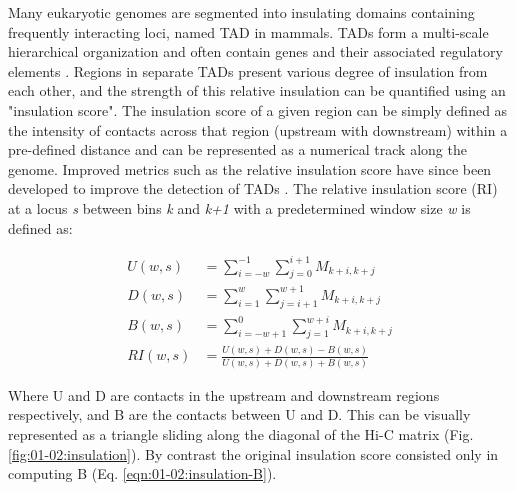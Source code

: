 Many eukaryotic genomes are segmented into insulating domains containing frequently interacting loci, named \acrshort{TAD} in mammals. \acrshort{TAD}s form a multi-scale hierarchical organization and often contain genes and their associated regulatory elements \cite{salviatoLeveragingThreedimensionalChromatin2021}. Regions in separate \acrshort{TAD}s present various degree of insulation from each other, and the strength of this relative insulation can be quantified using an "insulation score". The insulation score of a given region can be simply defined as the intensity of contacts across that region (upstream with downstream) within a pre-defined distance \cite{craneCondensindrivenRemodellingChromosome2015} and can be represented as a numerical track along the genome. Improved metrics such as the relative insulation score have since been developed to improve the detection of \acrshort{TAD}s \cite{chenHiCDBSensitiveRobust2018}. The relative insulation score (RI) at a locus \textit{s} between bins \textit{k} and \textit{k+1} with a predetermined window size \textit{w} is defined as:

\begin{align}
    \label{eqn:01-02:insulation-U}
    U(w, s) &= \sum_{i=-w}^{-1}{\sum_{j=0}^{i+1}{M_{k+i,k+j}}} \\
    \label{eqn:01-02:insulation-D}
    D(w, s) &= \sum_{i=1}^{w}{\sum_{j=i+1}^{w+1}{M_{k+i,k+j}}} \\
    \label{eqn:01-02:insulation-B}
    B(w, s) &= \sum_{i=-w+1}^{0}{\sum_{j=1}^{w+i}{M_{k+i,k+j}}} \\
    \label{eqn:01-02:insulation-RI}
    RI(w, s) &= \frac{U(w, s) + D(w, s) - B(w, s)}{U(w, s) + D(w, s) + B(w, s)}
\end{align}

Where U and D are contacts in the upstream and downstream regions respectively, and B are the contacts between U and D. This can be visually represented as a triangle sliding along the diagonal of the Hi-C matrix (Fig. \ref{fig:01-02:insulation}). By contrast the original insulation score consisted only in computing B (Eq. \ref{eqn:01-02:insulation-B}).


